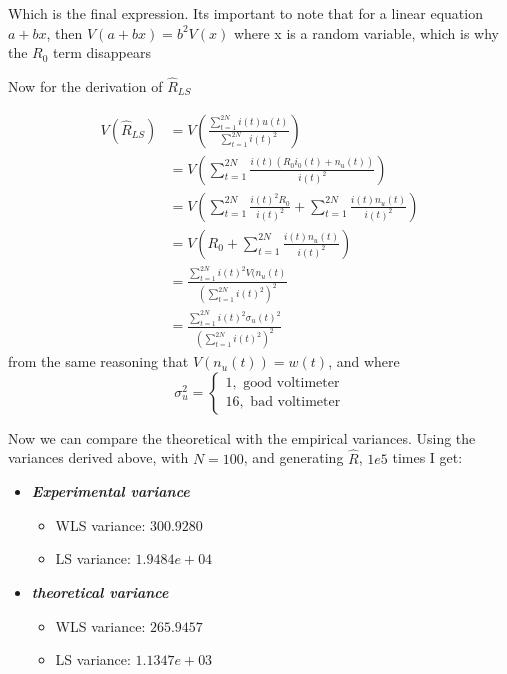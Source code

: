\documentclass[12pt,a4paper, onecolumn]{exam}
\begin{document}
\begin{questions}
\begin{parts}
\begin{solution}
    Which is the final expression. Its important to note that for a linear equation $ a+bx $, then $ V(a+bx) = b^2V(x) $ where x is a random variable, which is why the $ R_0 $ term disappears
    
    Now for the derivation of $ \hat{R}_{LS} $ 

    \begin{align*}
      V(\hat{R}_{LS}) &=  V \left( \frac{ \sum_{ t=1 }^{ 2N } i(t)u(t) }{ \sum_{ t=1 }^{ 2N } i(t)^2 } \right) \\
      &= V \left( \sum_{ t=1 }^{ 2N } \frac{ i(t) \left( R_0i_0(t) + n_u(t) \right)  }{ i(t)^2 } \right) \\
      &= V \left( \sum_{ t=1 }^{ 2N } \frac{ i(t)^2 R_0 }{ i(t)^2 } + \sum_{ t=1 }^{ 2N } \frac{ i(t) n_u(t) }{ i(t)^2 } \right) \\
      &= V \left( R_0 + \sum_{ t=1 }^{ 2N } \frac{ i(t) n_u(t) }{ i(t)^2 } \right) \\
      &=  \frac{ \sum_{ t=1 }^{ 2N } i(t)^2 V(n_u(t)}{ \left( \sum_{ t=1 }^{ 2N } i(t)^2 \right)^2  } \\
      &= \frac{ \sum_{ t=1 }^{ 2N } i(t)^2 \sigma_u(t)^2 }{ \left( \sum_{ t=1 }^{ 2N } i(t)^2 \right)^2  }
    \end{align*}
    from the same reasoning that $ V(n_u(t))= w(t) $, and where 
    \[ 
        \sigma_u^2 = \begin{cases}
          1, \text{ good voltimeter}\\
          16, \text{ bad voltimeter}
        \end{cases}
    \]

    Now we can compare the theoretical with the empirical variances. Using the variances derived above, with $ N = 100 $, and generating $ \hat{R} $, $ 1e5 $ times I get:

    \begin{itemize}
      \item \textbf{\textit{Experimental variance}}
      \begin{itemize}
        \item WLS variance: $ 300.9280 $
        \item LS variance: $ 1.9484e+04 $  
      \end{itemize}
    \end{itemize}

    \begin{itemize}
      \item \textbf{\textit{theoretical variance}}
      \begin{itemize}
        \item WLS variance: $ 265.9457 $
        \item LS variance: $ 1.1347e+03 $  
      \end{itemize}
    \end{itemize}
    


\end{solution}
\end{parts}
\end{questions}
\end{document}
